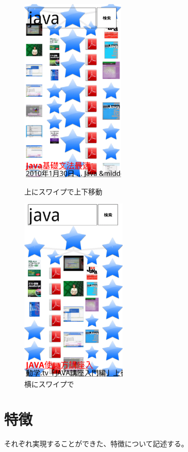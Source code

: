 \begin{figure}[htbp]
 \begin{minipage}{0.45\hsize}
  \begin{center}
   \includegraphics[height=90mm]{eps/le05.eps}
  \end{center}
  \caption{上にスワイプで上下移動}
  \label{le05}
 \end{minipage}
 \begin{minipage}{0.45\hsize}
  \begin{center}
   \includegraphics[height=90mm]{eps/le06.eps}
  \end{center}
  \caption{横にスワイプで}
  \label{le06}
 \end{minipage}
\end{figure}

\section{特徴}
それぞれ実現することができた、特徴について記述する。

